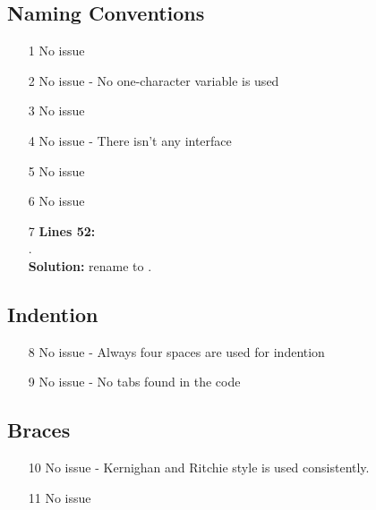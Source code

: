 
\subsection{Naming Conventions}
\begin{itemize}
	\item[1] No issue
	\item[2] No issue - No one-character variable is used
	\item[3] No issue
	\item[4] No issue - There isn't any interface
	\item[5] No issue
	\item[6] No issue
	\item[7]  \textbf{Lines 52:}\\
	. \\
	\textbf{Solution: } rename to .
	
\end{itemize}
\subsection{Indention}
\begin{itemize}
	\item[8] No issue - Always four spaces are used for indention
	\item[9] No issue - No tabs found in the code
\end{itemize}
\subsection{Braces}
\begin{itemize}
	\item[10] No issue - Kernighan and Ritchie style is used consistently.
	\item[11] No issue 
\end{itemize}
